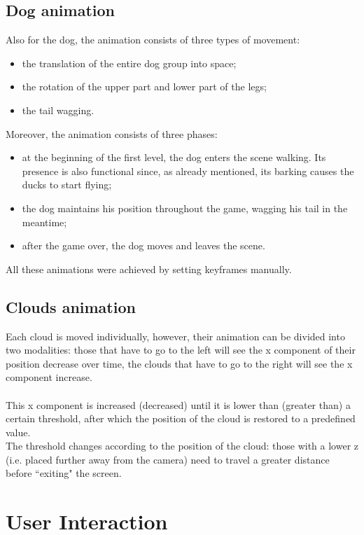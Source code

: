 \documentclass[12pt,a4paper]{article}
\begin{document}
	\subsection{Dog animation}
	Also for the dog, the animation consists of three types of movement:
	\begin{itemize}
		\item the translation of the entire dog group into space;
		\item the rotation of the upper part and lower part of the legs;
		\item the tail wagging.
	\end{itemize}
	Moreover, the animation consists of three phases:
	\begin{itemize}
		\item at the beginning of the first level, the dog enters the scene walking. Its presence is also functional since, as already mentioned, its barking causes the ducks to start flying;
		\item the dog maintains his position throughout the game, wagging his tail in the meantime;
		\item after the game over, the dog moves and leaves the scene.
	\end{itemize}
	All these animations were achieved by setting keyframes manually. 
	
	\subsection{Clouds animation}
	Each cloud is moved individually, however, their animation can be divided into two modalities: those that have to go to the left will see the x component of their position decrease over time, the clouds that have to go to the right will see the x component increase.\\\\
	This x component is increased (decreased) until it is lower than (greater than) a certain threshold, after which the position of the cloud is restored to a predefined value.\\
	The threshold changes according to the position of the cloud: those with a lower z (i.e. placed further away from the camera) need to travel a greater distance before ``exiting" the screen.
	
	
	\section{User Interaction} \label{user}
\end{document}
